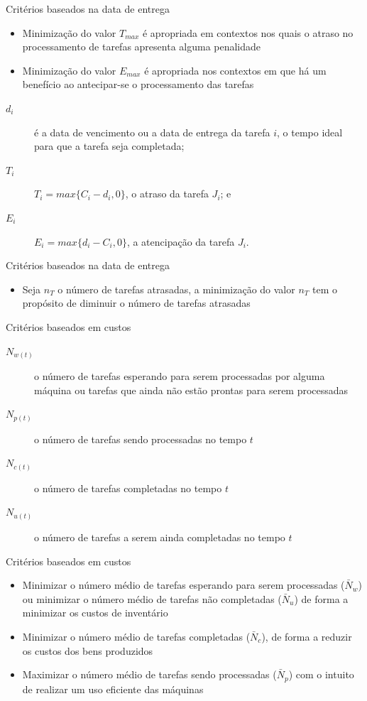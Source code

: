 \documentclass{beamer}
\begin{document}
\begin{frame}{Crit\'{e}rios baseados na data de entrega}
\begin{itemize}
\item<1-> Minimiza\c{c}\~{a}o do valor $T_{max}$ \'{e} apropriada em contextos nos quais o atraso no processamento de tarefas
apresenta alguma penalidade
\item<2-> Minimiza\c{c}\~{a}o do valor $E_{max}$ \'{e} apropriada nos contextos em que h\'{a} um benef\'{i}cio ao antecipar-se
o processamento das tarefas
\end{itemize}
\begin{description}
\item[$d_{i}$] \'{e} a data de vencimento ou a data de entrega da tarefa $i$, o tempo ideal para que a tarefa seja completada;
\item[$T_{i}$] $T_{i} = \textit{max}\{C_{i} - d_{i} , 0\}$, o atraso da tarefa $J_{i}$; e
\item[$E_{i}$] $E_{i} = \textit{max}\{d_{i} - C_{i} , 0\}$, a atencipa\c{c}\~{a}o da tarefa $J_{i}$.
\end{description}
\end{frame}
\begin{frame}{Crit\'{e}rios baseados na data de entrega}
\begin{itemize}
\item<1-> Seja $n_{T}$ o número de tarefas atrasadas, a minimização do valor $n_{T}$ tem o propósito de diminuir o número de
tarefas atrasadas
\end{itemize}
\end{frame}
\begin{frame}{Crit\'{e}rios baseados em custos}
\begin{description}
\item[$N_{w(t)}$] o n\'{u}mero de tarefas esperando para serem processadas por alguma m\'{a}quina ou tarefas que ainda n\~{a}o est\~{a}o prontas
para serem processadas
\item[$N_{p(t)}$] o n\'{u}mero de tarefas sendo processadas no tempo $t$
\item[$N_{c(t)}$] o n\'{u}mero de tarefas completadas no tempo $t$
\item[$N_{u(t)}$] o n\'{u}mero de tarefas a serem ainda completadas no tempo $t$
\end{description}
\end{frame}
\begin{frame}{Crit\'{e}rios baseados em custos}
\begin{itemize}
\item<1-> Minimizar o n\'{u}mero m\'{e}dio de tarefas esperando para serem processadas ($\bar{N}_{w}$) ou minimizar o n\'{u}mero m\'{e}dio de
tarefas n\~{a}o completadas ($\bar{N}_{u}$) de forma a minimizar os custos de invent\'{a}rio
\item<2-> Minimizar o n\'{u}mero m\'{e}dio de tarefas completadas ($\bar{N}_{c}$), de forma a reduzir os custos dos bens produzidos
\item<3-> Maximizar o n\'{u}mero m\'{e}dio de tarefas sendo processadas ($\bar{N}_{p}$) com o intuito de realizar um uso eficiente das m\'{a}quinas
\end{itemize}
\end{frame}
\end{document}
